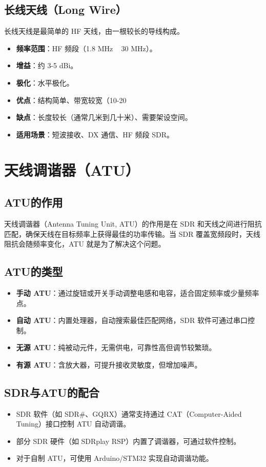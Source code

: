 \documentclass[12pt,UTF8]{ctexbook}
\begin{document}
\subsection{长线天线（Long Wire）}
长线天线是最简单的 HF 天线，由一根较长的导线构成。

\begin{itemize}[leftmargin=2cm]
    \item \textbf{频率范围}：HF 频段（1.8 MHz ~ 30 MHz）。
    \item \textbf{增益}：约 3-5 dBi。
    \item \textbf{极化}：水平极化。
    \item \textbf{优点}：结构简单、带宽较宽（10-20%
    \item \textbf{缺点}：长度较长（通常几米到几十米）、需要架设空间。
    \item \textbf{适用场景}：短波接收、DX 通信、HF 频段 SDR。
\end{itemize}

\section{天线调谐器（ATU）}
\label{sec:atu}

\subsection{ATU的作用}
天线调谐器（Antenna Tuning Unit, ATU）的作用是在 SDR 和天线之间进行阻抗匹配，确保天线在目标频率上获得最佳的功率传输。当 SDR 覆盖宽频段时，天线阻抗会随频率变化，ATU 就是为了解决这个问题。

\subsection{ATU的类型}
\begin{itemize}[leftmargin=2cm]
    \item \textbf{手动 ATU}：通过旋钮或开关手动调整电感和电容，适合固定频率或少量频率点。
    \item \textbf{自动 ATU}：内置处理器，自动搜索最佳匹配网络，SDR 软件可通过串口控制。
    \item \textbf{无源 ATU}：纯被动元件，无需供电，可靠性高但调节较繁琐。
    \item \textbf{有源 ATU}：含放大器，可提升接收灵敏度，但增加噪声。
\end{itemize}

\subsection{SDR与ATU的配合}
\begin{itemize}[leftmargin=2cm]
    \item SDR 软件（如 SDR\#、GQRX）通常支持通过 CAT（Computer-Aided Tuning）接口控制 ATU 自动调谐。
    \item 部分 SDR 硬件（如 SDRplay RSP）内置了调谐器，可通过软件控制。
    \item 对于自制 ATU，可使用 Arduino/STM32 实现自动调谐功能。
\end{itemize}
\end{document}
